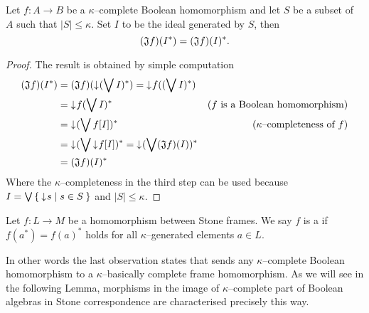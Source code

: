 \begin{observation}
    Let $f\colon A \to B$ be a $\kappa$--complete Boolean homomorphism and let $S$ be a subset of $A$ such that $|S| \leq \kappa$. Set $I$ to be the ideal generated by $S$, then
    $$(\mathfrak{J} f)(I^*) = (\mathfrak{J} f)(I)^*.$$
\end{observation}
\begin{proof}
    The result is obtained by simple computation
    \begin{align*}
        (\mathfrak{J} f)(I^*) &= (\mathfrak{J} f)(\mathord{\downarrow}\mkern1mu (\bigvee I)^*) = \mathord{\downarrow}\mkern1mu f((\bigvee I)^*) \\
                &= \mathord{\downarrow}\mkern1mu f(\bigvee I)^* & \text{($f$ is a Boolean homomorphism)} \\
                &= \mathord{\downarrow}\mkern1mu (\bigvee f[I])^* & \text{($\kappa$--completeness of $f$)} \\
                &= \mathord{\downarrow}\mkern1mu (\bigvee \mathord{\downarrow}\mkern1mu f[I])^* = \mathord{\downarrow}\mkern1mu (\bigvee (\mathfrak{J} f)(I))^* \\
                &= (\mathfrak{J} f)(I)^*
    \end{align*}
    Where the $\kappa$--completeness in the third step can be used because $I = \bigvee \Set{ \mathord{\downarrow}\mkern1mus | s \in S }$ and $|S| \leq \kappa$.
\end{proof}


\begin{definition}
    Let $f\colon L \to M$ be a homomorphism between Stone frames. We say $f$ is a  if $f(a^*) = f(a)^*$ holds for all $\kappa$--generated elements $a \in L$.
\end{definition}

In other words the last observation states that \J{} sends any $\kappa$--complete Boolean homomorphism to a $\kappa$--basically complete frame homomorphism. As we will see in the following Lemma, morphisms in the image of $\kappa$--complete part of Boolean algebras in Stone correspondence are characterised precisely this way.

